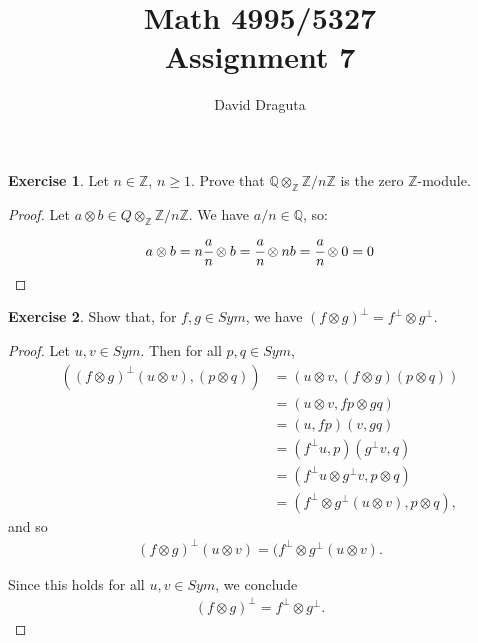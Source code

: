 \documentclass[12pt]{extarticle}
\title{ Math 4995/5327
  \\
  Assignment 7}
\author{David Draguta}
\newcommand{\Q}{\mathbb{Q}}
\newcommand{\Z}{\mathbb{Z}}
\newcommand{\<}{\langle}
\renewcommand{\>}{\rangle}
\theoremstyle{definition}
\newtheorem{exercise}{Exercise}
\begin{document}
\maketitle

\begin{exercise}
  Let $n \in \Z$, $n \geq 1$. Prove that $\Q \otimes_{\Z} \Z/n\Z$ is the zero $\Z$-module.
\end{exercise}

\begin{proof}
  Let $a \otimes b \in Q \otimes_{\Z}\Z/n\Z$. We have $a/n \in \Q$, so:
  \begin{align*}
    a \otimes b = n\cfrac{a}{n} \otimes b = \cfrac{a}{n} \otimes nb = \cfrac{a}{n} \otimes 0 = 0
  \end{align*}
\end{proof}

\begin{exercise}
  Show that, for $f,g \in Sym$, we have $(f \otimes g)^{\perp} = f^{\perp} \otimes g^{\perp}$.
\end{exercise}

\begin{proof}
  Let $u,v \in Sym$. Then for all $p,q \in Sym$, 
  \begin{align*}
    ((f \otimes g)^{\perp}(u \otimes v), (p \otimes q)) 
    &= (u \otimes v, (f \otimes g)(p \otimes q))\\
    &= (u \otimes v, fp \otimes gq) \\
    &= (u,fp)(v,gq) \\
    &= (f^{\perp} u, p)(g^{\perp}v, q) \\
    &= (f^{\perp}u \otimes g^{\perp}v, p \otimes q) \\
    &= (f^{\perp} \otimes g^{\perp} (u \otimes v), p \otimes q),
  \end{align*}
  and so 
  \begin{align*}
    (f \otimes g)^{\perp}(u \otimes v) = (f^{\perp} \otimes g^{\perp} (u \otimes v).
  \end{align*}

  Since this holds for all $u, v \in Sym$, we conclude
  \begin{align*}
    (f \otimes g)^{\perp} = f^{\perp} \otimes g^{\perp}.
  \end{align*}
\end{proof}
\end{document}
